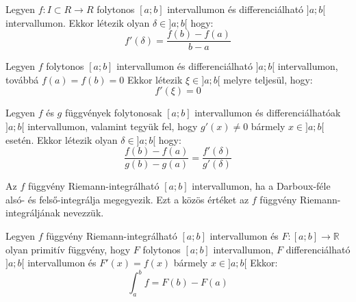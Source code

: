 \documentclass[12pt,a4paper]{article}
\begin{document}
\begin{tcolorbox}[colback=green!5!white,colframe=green!60!black,title= 1. Lagrange középérték tétel]
    Legyen \(f : I \subset R \to R\) folytonos \([a; b]\) intervallumon és differenciálható \(]a; b[\) intervallumon. Ekkor
létezik olyan \(\delta \in ]a; b[\) hogy:
$$f'(\delta) = \frac{f(b)-f(a)}{b-a}$$
\end{tcolorbox}

\begin{tcolorbox}[colback=green!5!white,colframe=green!60!black,title= 2. Rolle középérték tétel]
    Legyen \(f\) folytonos \([a; b]\) intervallumon és differenciálható \(]a; b[\) intervallumon, továbbá \(f(a) = f(b) = 0\)
Ekkor létezik \( \xi \in ]a; b[\) melyre teljesül, hogy:
$$f'(\xi) = 0$$
\end{tcolorbox}

\begin{tcolorbox}[colback=green!5!white,colframe=green!60!black,title= 3. Cauchy középérték tétel]
    Legyen \(f\) és \(g\) függvények folytonosak \([a; b]\) intervallumon és differenciálhatóak \(]a; b[\) intervallumon,
valamint tegyük fel, hogy \(g'(x) \neq 0\) bármely \(x \in ]a; b[\) esetén. Ekkor létezik olyan \(\delta \in]a; b[\) hogy:
$$\frac{f(b)-f(a)}{g(b)-g(a)} = \frac{f'(\delta)}{g'(\delta)}$$
\end{tcolorbox}

\begin{tcolorbox}[colback=green!5!white,colframe=green!60!black,title= 4. Riemann-Integrálhatóság]
    Az \(f\) függvény Riemann-integrálható \([a; b]\) intervallumon, ha a Darboux-féle alsó- és felső-integrálja
megegyezik. Ezt a közös értéket az \(f\) függvény Riemann-integráljának nevezzük.
\end{tcolorbox}

\begin{tcolorbox}[colback=green!5!white,colframe=green!60!black,title= 5. Newton-Leibniz formula]
    Legyen \(f\) függvény Riemann-integrálható \([a; b]\) intervallumon és \(F : [a; b] \to \mathbb{R} \) olyan primitív függvény,
hogy \(F\) folytonos \([a; b]\) intervallumon, \(F\) differenciálható \(]a; b[\) intervallumon és \(F'(x) = f(x)\) bármely
\(x \in ]a; b[\) Ekkor:
$$\int_{a}^{b} f = F(b)-F(a) $$
\end{tcolorbox}
\end{document}
